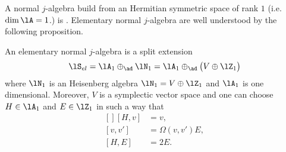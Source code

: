 A normal $j$-algebra build from an Hermitian symmetric space of rank $1$ (i.e. $\dim\lA=1$.) is . Elementary normal $j$-algebra are well understood by the following proposition.

\begin{proposition}     \label{PropStructNormalElementaireJalg}
    An elementary normal $j$-algebra is a split extension
    \begin{equation}        \label{EqDecoEleJal}
        \lS_{el}=\lA_{1}\oplus_{\ad}\lN_1=\lA_1\oplus_{\ad}\big( V\oplus\lZ_1 \big)
    \end{equation}
    where $\lN_1$ is an Heisenberg algebra $\lN_1=V\oplus\lZ_1$ and $\lA_1$ is one dimensional. Moreover, $V$ is a symplectic vector space and one can choose $H\in \lA_1$ and $E\in\lZ_1$ in such a way that
    \begin{equation}            \label{EqRelColNormaljAlg}
        \begin{aligned}[]
            [H,v]&=v,\\
            [v,v']&=\Omega(v,v')E,\\
            [H,E]&=2E.
        \end{aligned}
    \end{equation}
\end{proposition}

